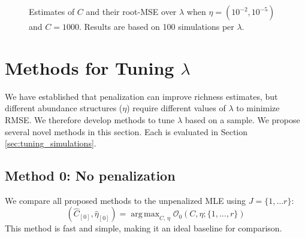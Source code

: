 \documentclass[12pt]{article}
\DeclareMathOperator*{\argmax}{arg\,max}
\begin{document}
\begin{figure}[p]
\caption{Estimates of $C$ and their root-MSE over $\lambda$ when $\eta = (10^{-2}, 10^{-5})$ and $C = 1000$. Results are based on 100 simulations per $\lambda$.
\label{fig:fixed_lambda_2}}
\centering{}
\end{figure}

\section{Methods for Tuning $\lambda$}
\label{sec:tuning_proposals}

We have established that penalization can improve richness estimates, but different abundance structures ($\eta$) require different values of $\lambda$ to minimize RMSE. We therefore develop methods to tune $\lambda$ based on a sample.  We propose several novel methods in this section.  Each is evaluated in Section \ref{sec:tuning_simulations}.

\setcounter{subsection}{-1}
\subsection{Method 0: No penalization}

We compare all proposed methods to the unpenalized MLE using $J = \{1, \dots r \}$:
\begin{equation}
\left(\widehat{C}_{[0]},  \widehat{\eta}_{[0]} \right) = \argmax_{C, \, \eta}  \mathcal{O}_{0}\left(C, \eta ; \{1, \dots , r\} \right) \label{eq:c_hat_0}
\end{equation}
This method is fast and simple, making it an ideal baseline for comparison.
\end{document}

